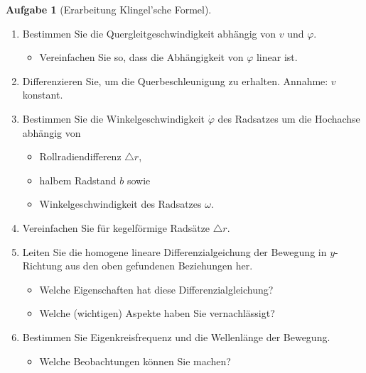 \documentclass[10pt,a4paper,headsepline,smallheadings]{scrartcl}
\theoremstyle{definition}
\newtheorem{aufgabe}{Aufgabe}
\begin{document}
\begin{aufgabe}[Erarbeitung Klingel'sche Formel]
\begin{enumerate}
	\item Bestimmen Sie die Quergleitgeschwindigkeit abh\"angig von $v$ und $\varphi$.
	\begin{itemize}
		\item Vereinfachen Sie so, dass die Abh\"angigkeit von $\varphi$ linear ist.
		\end{itemize}
	\item Differenzieren Sie, um die Querbeschleunigung zu erhalten. Annahme: $v$ konstant.
	\item Bestimmen Sie die Winkelgeschwindigkeit $\dot{\varphi}$ des Radsatzes um die Hochachse abh\"angig von
	\begin{itemize}
		\item Rollradiendifferenz $\triangle r$,
		\item halbem Radstand $b$ sowie 
		\item Winkelgeschwindigkeit des Radsatzes $\omega$.
	\end{itemize}
	\item Vereinfachen Sie f\"ur kegelf\"ormige Rads\"atze $\triangle r$.
	\item Leiten Sie die homogene lineare Differenzialgeichung der Bewegung in $y$-Richtung aus den oben gefundenen Beziehungen her.
	\begin{itemize}
		\item Welche Eigenschaften hat diese Differenzialgleichung?
		\item Welche (wichtigen) Aspekte haben Sie vernachl\"assigt?
	\end{itemize}
	\item Bestimmen Sie Eigenkreisfrequenz und die Wellenl\"ange der Bewegung.
	\begin{itemize}
		\item Welche Beobachtungen k\"onnen Sie machen?
	\end{itemize}
\end{enumerate}


\end{aufgabe}
\end{document}
